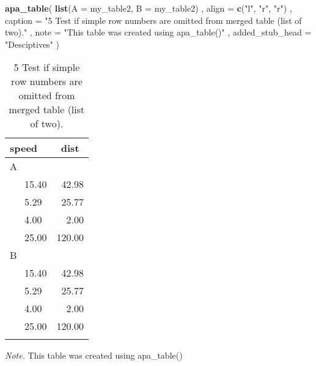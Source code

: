 \documentclass[man]{apa6}
\newenvironment{Shaded}{\begin{snugshade}}{\end{snugshade}}
\newcommand{\KeywordTok}[1]{\textcolor[rgb]{0.13,0.29,0.53}{\textbf{#1}}}
\newcommand{\DataTypeTok}[1]{\textcolor[rgb]{0.13,0.29,0.53}{#1}}
\newcommand{\StringTok}[1]{\textcolor[rgb]{0.31,0.60,0.02}{#1}}
\newcommand{\NormalTok}[1]{#1}
\begin{document}
\begin{Shaded}
\begin{Highlighting}[]
\KeywordTok{apa_table}\NormalTok{(}
  \KeywordTok{list}\NormalTok{(}\DataTypeTok{A =}\NormalTok{ my_table2, }\DataTypeTok{B =}\NormalTok{ my_table2)}
\NormalTok{  , }\DataTypeTok{align =} \KeywordTok{c}\NormalTok{(}\StringTok{"l"}\NormalTok{, }\StringTok{"r"}\NormalTok{, }\StringTok{"r"}\NormalTok{)}
\NormalTok{  , }\DataTypeTok{caption =} \StringTok{"5 Test if simple row numbers are omitted from merged table (list of two)."}
\NormalTok{  , }\DataTypeTok{note =} \StringTok{"This table was created using apa_table()"}
\NormalTok{  , }\DataTypeTok{added_stub_head =} \StringTok{"Desciptives"}
\NormalTok{)}
\end{Highlighting}
\end{Shaded}

\begin{table}[tbp]
\begin{center}
\begin{threeparttable}
\caption{\label{tab:unnamed-chunk-5}5 Test if simple row numbers are omitted from merged table (list of two).}
\begin{tabular}{lr}
\toprule
speed & \multicolumn{1}{c}{dist}\\
\midrule
A & \\
\ \ \ 15.40 & 42.98\\
\ \ \ 5.29 & 25.77\\
\ \ \ 4.00 & 2.00\\
\ \ \ 25.00 & 120.00\\
B & \\
\ \ \ 15.40 & 42.98\\
\ \ \ 5.29 & 25.77\\
\ \ \ 4.00 & 2.00\\
\ \ \ 25.00 & 120.00\\
\bottomrule
\addlinespace
\end{tabular}
\begin{tablenotes}[para]
\textit{Note.} This table was created using apa\_table()
\end{tablenotes}
\end{threeparttable}
\end{center}
\end{table}
\end{document}
